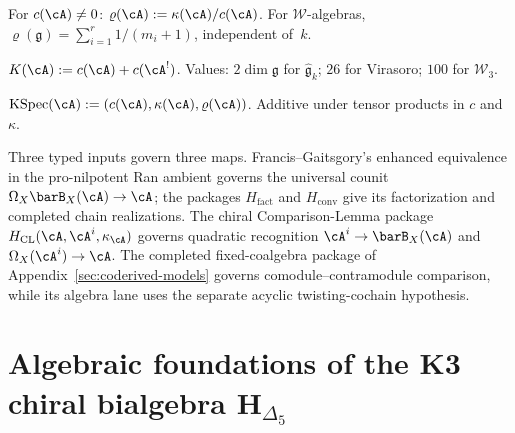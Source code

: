\begin{definition}\label{def:anomaly-ratio}
For $c(\cA) \neq 0$: $\varrho(\cA) := \kappa(\cA)/c(\cA)$.
For $\mathcal{W}$-algebras,
$\varrho(\mathfrak{g}) = \sum_{i=1}^r 1/(m_i+1)$, independent
of~$k$.
\end{definition}

\begin{definition}\label{def:koszul-conductor}
\ClaimStatusDefinitional
{}
$K(\cA) := c(\cA) + c(\cA^!)$. Values: $2\dim\mathfrak{g}$ for
$\widehat{\mathfrak{g}}_k$; $26$ for Virasoro; $100$ for
$\mathcal{W}_3$.
\end{definition}

\begin{definition}\label{def:koszul-spectrum}
$\operatorname{KSpec}(\cA) := (c(\cA), \kappa(\cA),
\varrho(\cA))$. Additive under tensor products in $c$
and~$\kappa$.
\end{definition}

\begin{remark}\label{rem:existence-regimes}
\label{rem:existence-koszul}
Three typed inputs govern three maps.  Francis--Gaitsgory's enhanced
equivalence in the pro-nilpotent Ran ambient governs the universal
counit $\Omega_X\barB_X(\cA)\to\cA$; the packages
$H_{\mathrm{fact}}$ and $H_{\mathrm{conv}}$ give its factorization
and completed chain realizations. The chiral Comparison-Lemma package
$H_{\mathrm{CL}}(\cA,\cA^i,\kappa_\cA)$ governs quadratic
recognition $\cA^i\to\barB_X(\cA)$ and
$\Omega_X(\cA^i)\to\cA$. The completed fixed-coalgebra package of
Appendix~\ref{sec:coderived-models} governs comodule--contramodule
comparison, while its algebra lane uses the separate acyclic
twisting-cochain hypothesis.
\end{remark}


\section{Algebraic foundations of the K3 chiral bialgebra
$\mathbf H_{\Delta_5}$}
\label{sec:algfnd-supplement}

